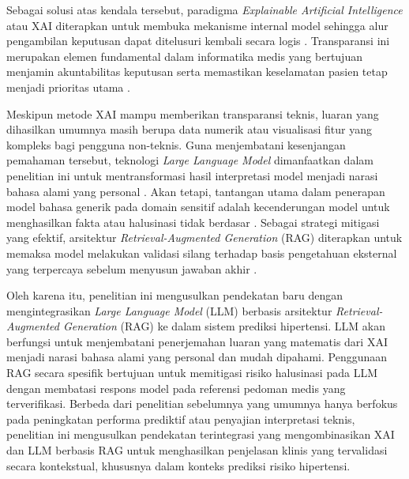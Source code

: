 Sebagai solusi atas kendala tersebut, paradigma \textit{Explainable Artificial Intelligence} atau XAI diterapkan untuk membuka mekanisme internal model sehingga alur pengambilan keputusan dapat ditelusuri kembali secara logis \parencite{Adadi2018}. Transparansi ini merupakan elemen fundamental dalam informatika medis yang bertujuan menjamin akuntabilitas keputusan serta memastikan keselamatan pasien tetap menjadi prioritas utama \parencite{Holzinger2019}.

Meskipun metode XAI mampu memberikan transparansi teknis, luaran yang dihasilkan umumnya masih berupa data numerik atau visualisasi fitur yang kompleks bagi pengguna non-teknis. Guna menjembatani kesenjangan pemahaman tersebut, teknologi \textit{Large Language Model} dimanfaatkan dalam penelitian ini untuk mentransformasi hasil interpretasi model menjadi narasi bahasa alami yang personal \parencite{Thirunavukarasu2023Large}. Akan tetapi, tantangan utama dalam penerapan model bahasa generik pada domain sensitif adalah kecenderungan model untuk menghasilkan fakta atau halusinasi tidak berdasar \parencite{Ji2023Survey}. Sebagai strategi mitigasi yang efektif, arsitektur \textit{Retrieval-Augmented Generation} (RAG) diterapkan untuk memaksa model melakukan validasi silang terhadap basis pengetahuan eksternal yang terpercaya sebelum menyusun jawaban akhir \parencite{Lewis2020Retrieval}.

Oleh karena itu, penelitian ini mengusulkan pendekatan baru dengan mengintegrasikan \textit{Large Language Model} (LLM) berbasis arsitektur \textit{Retrieval-Augmented Generation} (RAG) ke dalam sistem prediksi hipertensi. LLM akan berfungsi untuk menjembatani penerjemahan luaran yang matematis dari XAI menjadi narasi bahasa alami yang personal dan mudah dipahami. Penggunaan RAG secara spesifik bertujuan untuk memitigasi risiko halusinasi pada LLM dengan membatasi respons model pada referensi pedoman medis yang terverifikasi. Berbeda dari penelitian sebelumnya yang umumnya hanya berfokus pada peningkatan performa prediktif atau penyajian interpretasi teknis, penelitian ini mengusulkan pendekatan terintegrasi yang mengombinasikan XAI dan LLM berbasis RAG untuk menghasilkan penjelasan klinis yang tervalidasi secara kontekstual, khususnya dalam konteks prediksi risiko hipertensi.

